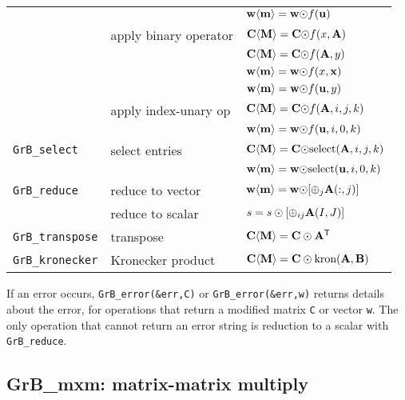 \documentclass[12pt]{article}
\begin{document}
{\begin{tabular}{lll}
                     &                         & ${\bf w \langle m \rangle = w \odot} f{\bf (u)}$ \\
                     & apply binary operator   & ${\bf C \langle M \rangle = C \odot} f(x,{\bf A})$ \\
                     &                         & ${\bf C \langle M \rangle = C \odot} f({\bf A},y)$ \\
                     &                         & ${\bf w \langle m \rangle = w \odot} f(x,{\bf x})$ \\
                     &                         & ${\bf w \langle m \rangle = w \odot} f({\bf u},y)$ \\
                     & apply index-unary op    & ${\bf C \langle M \rangle = C \odot} f({\bf A},i,j,k)$ \\
                     &                         & ${\bf w \langle m \rangle = w \odot} f({\bf u},i,0,k)$ \\
\hline
\verb'GrB_select'    & select entries          & ${\bf C \langle M \rangle = C \odot} \mbox{select}({\bf A},i,j,k)$ \\
                     &                         & ${\bf w \langle m \rangle = w \odot} \mbox{select}({\bf u},i,0,k)$ \\
\hline
\verb'GrB_reduce'    & reduce to vector        & ${\bf w \langle m \rangle = w \odot} [{\oplus}_j {\bf A}(:,j)]$ \\
                     & reduce to scalar        & $s = s \odot [{\oplus}_{ij}  {\bf A}(I,J)]$ \\
\hline
\verb'GrB_transpose' & transpose               & ${\bf C \langle M \rangle = C \odot A^{\sf T}}$ \\
\hline
\verb'GrB_kronecker' & Kronecker product       & ${\bf C \langle M \rangle = C \odot \mbox{kron}(A, B)}$ \\
\hline
\end{tabular}
}
\vspace{0.2in}

If an error occurs, \verb'GrB_error(&err,C)' or \verb'GrB_error(&err,w)'
returns details about the error, for operations that return a modified matrix
\verb'C' or vector \verb'w'.  The only operation that cannot return an error
string is reduction to a scalar with \verb'GrB_reduce'.

\newpage
\subsection{{\sf GrB\_mxm:} matrix-matrix multiply} %
\label{mxm}
\end{document}
